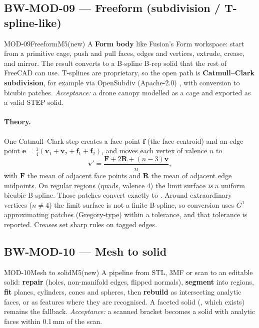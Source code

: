 \subsection{BW-MOD-09 --- Freeform (subdivision / T-spline-like)}

\begin{epic}{MOD-09}{Freeform}{M5}{\stTodo}{(new)}
A \textbf{Form body} like Fusion's Form workspace: start from a primitive cage, push and pull faces, edges and
vertices, extrude, crease, and mirror. The result converts to a B-spline B-rep solid that the rest of FreeCAD
can use. T-splines are proprietary, so the open path is \textbf{Catmull--Clark subdivision}, for example via
OpenSubdiv (Apache-2.0) \verify, with conversion to bicubic patches.
\emph{Acceptance:} a drone canopy modelled as a cage and exported as a valid STEP solid.
\end{epic}

\paragraph{Theory.} One Catmull--Clark step creates a face point $\mathbf f$ (the face centroid) and an edge
point $\mathbf e=\tfrac14(\mathbf v_1+\mathbf v_2+\mathbf f_1+\mathbf f_2)$, and moves each vertex of
valence $n$ to
\[
  \mathbf v'=\frac{\mathbf F+2\mathbf R+(n-3)\mathbf v}{n},
\]
with $\mathbf F$ the mean of adjacent face points and $\mathbf R$ the mean of adjacent edge midpoints. On
regular regions (quads, valence 4) the limit surface \emph{is} a uniform bicubic B-spline. Those patches
convert exactly to . Around extraordinary vertices ($n\neq4$) the limit surface
is not a finite B-spline, so conversion uses $G^1$ approximating patches (Gregory-type) within a tolerance,
and that tolerance is reported. Creases set sharp rules on tagged edges.

\subsection{BW-MOD-10 --- Mesh to solid}

\begin{epic}{MOD-10}{Mesh to solid}{M5}{\stTodo}{(new)}
A pipeline from STL, 3MF or scan to an editable solid: \textbf{repair} (holes, non-manifold edges, flipped
normals), \textbf{segment} into regions, \textbf{fit} planes, cylinders, cones and spheres, then
\textbf{rebuild} as intersecting analytic faces, or as features where they are recognised. A faceted solid
(, which exists) remains the fallback.
\emph{Acceptance:} a scanned bracket becomes a solid with analytic faces within 0.1\,mm of the scan.
\end{epic}

